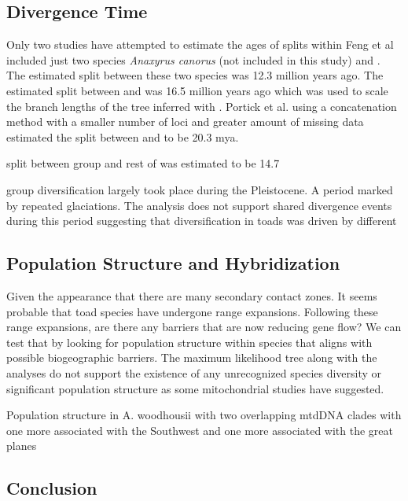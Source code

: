 \subsection{Divergence Time}
Only two studies have attempted to estimate the ages of splits within \anaxyrus 
Feng et al included just two species \textit{Anaxyrus canorus} (not included in this study)
and \punctatus. The estimated split between these two species was 12.3 million years ago.
The estimated split between \incillius and \anaxyrus was 16.5 million years ago 
which was used to scale the branch lengths of the tree inferred with \phycoeval.
Portick et al. using a concatenation method with a smaller number of loci and 
greater amount of missing data estimated the split between \incillius and 
\anaxyrus to be 20.3 mya.

split between \punctatus group and rest of \anaxyrus was estimated to be 14.7 



\amer group diversification largely took place during the Pleistocene.
A period marked by repeated glaciations. 
The \phycoeval analysis does not support shared divergence events during this  
period suggesting that diversification in toads was driven by different 


\subsection{Population Structure and Hybridization}
Given the appearance that there are many secondary contact zones. It seems 
probable that toad species have undergone range expansions. Following these
range expansions, are there any barriers that are now reducing gene flow?
We can test that by looking for population structure within species that 
aligns with possible biogeographic barriers.
The maximum likelihood tree along with the \structure analyses do not support
the existence of any unrecognized species diversity or significant population 
structure as some mitochondrial studies have suggested.


Population structure in A. woodhousii with two overlapping mtdDNA clades 
with one more associated with the Southwest and one more associated with the 
great planes \parencite{masta2003}


\subsection{Conclusion}